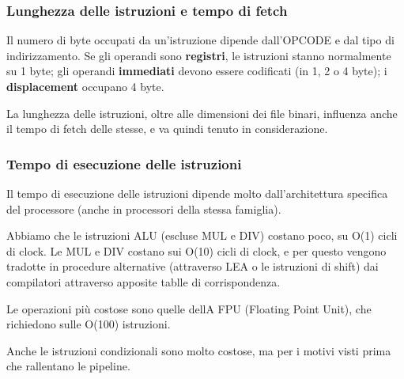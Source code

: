 \documentclass[a4paper,11pt]{article}
\begin{document}
\subsubsection{Lunghezza delle istruzioni e tempo di fetch}
Il numero di byte occupati da un'istruzione dipende dall'OPCODE e dal tipo di indirizzamento.
Se gli operandi sono \textbf{registri}, le istruzioni stanno normalmente su 1 byte; gli operandi \textbf{immediati} devono essere codificati (in 1, 2 o 4 byte); i \textbf{displacement} occupano 4 byte.

La lunghezza delle istruzioni, oltre alle dimensioni dei file binari, influenza anche il tempo di fetch delle stesse, e va quindi tenuto in considerazione.

\subsubsection{Tempo di esecuzione delle istruzioni}
Il tempo di esecuzione delle istruzioni dipende molto dall'architettura specifica del processore (anche in processori della stessa famiglia).

Abbiamo che le istruzioni ALU (escluse MUL e DIV) costano poco, su O(1) cicli di clock. Le MUL e DIV costano sui O(10) cicli di clock, e per questo vengono tradotte in procedure alternative (attraverso LEA o le istruzioni di shift) dai compilatori attraverso apposite tablle di corrispondenza.

Le operazioni più costose sono quelle dellA FPU (Floating Point Unit), che richiedono sulle O(100) istruzioni.

Anche le istruzioni condizionali sono molto costose, ma per i motivi visti prima che rallentano le pipeline.
\end{document}
